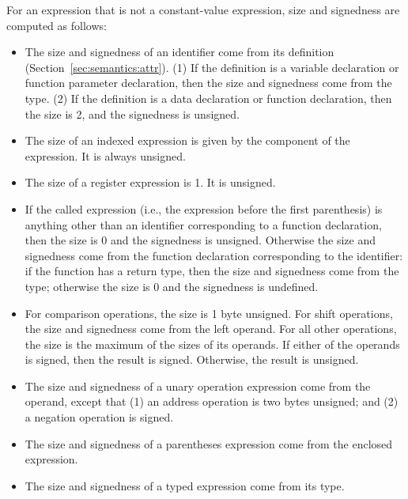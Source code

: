 \documentclass[10pt]{article}
\begin{document}
For an expression that is not a constant-value expression, size and
signedness are computed as follows:
%
\begin{itemize}
%
\item {} The size and signedness of an identifier
  come from its definition (Section~\ref{sec:semantics:attr}).  (1) If
  the definition is a variable declaration or function parameter
  declaration, then the size and signedness come from the type.  (2)
  If the definition is a data declaration or function declaration,
  then the size is 2, and the signedness is unsigned.
%
\item {} The size of an indexed expression
  is given by the  component of the expression.  It is
  always unsigned.  
%
\item {} The size of a register expression
  is 1.  It is unsigned.
%
\item {} If the called expression (i.e., the
  expression before the first parenthesis) is anything other than an
  identifier corresponding to a function declaration, then the size is
  0 and the signedness is unsigned.  Otherwise the size and signedness
  come from the function declaration corresponding to the identifier:
  if the function has a return type, then the size and signedness come
  from the type; otherwise the size is 0 and the signedness is
  undefined.
%
\item {}  For comparison
  operations, the size is 1 byte unsigned.  For shift operations, the
  size and signedness come from the left operand.  For all other
  operations, the size is the maximum of the sizes of its operands.
  If either of the operands is signed, then the result is signed.
  Otherwise, the result is unsigned.
%
\item {} The size and signedness of
  a unary operation expression come from the operand, except that (1)
  an address operation  is two bytes unsigned; and (2) a
  negation operation is signed.
%
\item {} The size and signedness of a
  parentheses expression come from the enclosed expression.
%
\item {} The size and signedness of a typed
  expression come from its type.
%
\end{itemize}
\end{document}

